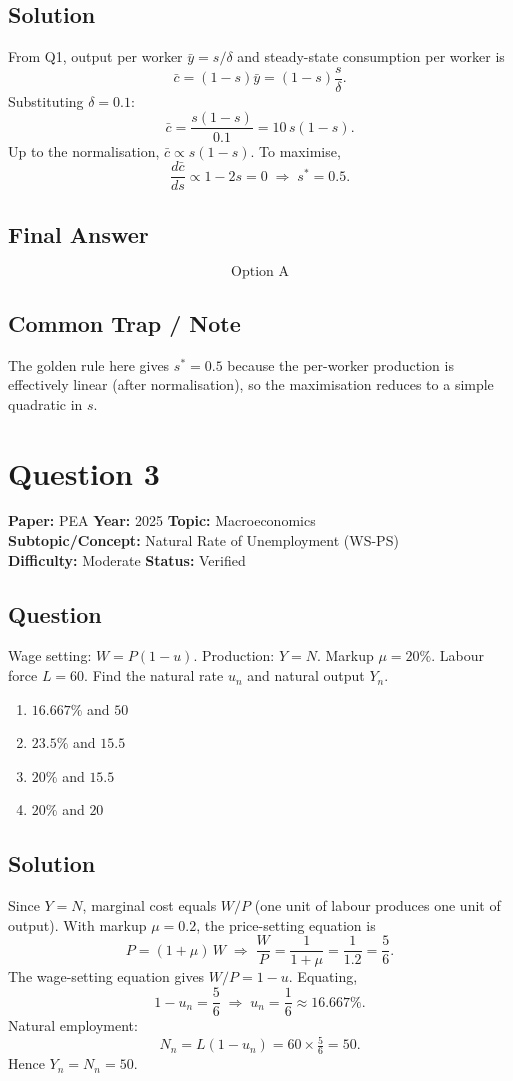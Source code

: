 \documentclass[11pt]{article}
\begin{document}
\subsection*{Solution}
From Q1, output per worker $\bar y = s/\delta$ and steady-state consumption per worker is
\[
\bar c = (1-s)\bar y = (1-s)\frac{s}{\delta}.
\]
Substituting $\delta = 0.1$:
\[
\bar c = \frac{s(1-s)}{0.1} = 10\, s(1-s).
\]
Up to the normalisation, $\bar c \propto s(1-s)$. To maximise,
\[
\frac{d\bar c}{ds} \propto 1 - 2s = 0 \;\Longrightarrow\; s^* = 0.5.
\]

\subsection*{Final Answer}
\[
\boxed{\text{Option A}}
\]

\subsection*{Common Trap / Note}
The golden rule here gives $s^* = 0.5$ because the per-worker production is effectively linear (after normalisation), so the maximisation reduces to a simple quadratic in $s$.

\section*{Question 3}
\textbf{Paper:} PEA \quad \textbf{Year:} 2025 \quad \textbf{Topic:} Macroeconomics \\
\textbf{Subtopic/Concept:} Natural Rate of Unemployment (WS-PS) \\
\textbf{Difficulty:} Moderate \quad \textbf{Status:} Verified

\subsection*{Question}
Wage setting: $W = P(1-u)$. Production: $Y = N$. Markup $\mu = 20\%$. Labour force $L = 60$. Find the natural rate $u_n$ and natural output $Y_n$.
\begin{enumerate}[label=(\Alph*)]
\item $16.667\%$ and $50$
\item $23.5\%$ and $15.5$
\item $20\%$ and $15.5$
\item $20\%$ and $20$
\end{enumerate}

\subsection*{Solution}
Since $Y = N$, marginal cost equals $W/P$ (one unit of labour produces one unit of output). With markup $\mu = 0.2$, the price-setting equation is
\[
P = (1+\mu)\, W \;\Longrightarrow\; \frac{W}{P} = \frac{1}{1+\mu} = \frac{1}{1.2} = \frac{5}{6}.
\]
The wage-setting equation gives $W/P = 1 - u$. Equating,
\[
1 - u_n = \frac{5}{6} \;\Longrightarrow\; u_n = \frac{1}{6} \approx 16.667\%.
\]
Natural employment:
\[
N_n = L(1-u_n) = 60 \times \tfrac{5}{6} = 50.
\]
Hence $Y_n = N_n = 50$.
\end{document}
